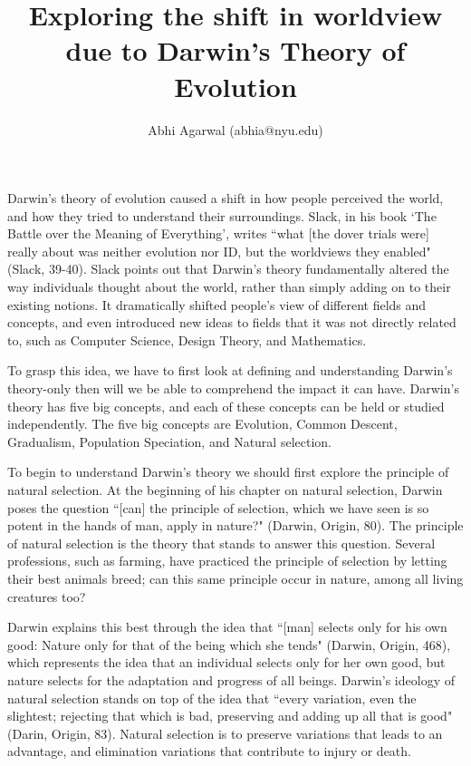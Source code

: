 \documentclass[11pt, oneside]{article}
\title{Exploring the shift in worldview due to Darwin's Theory of Evolution}
\author{Abhi Agarwal (abhia@nyu.edu)}
\date{}
\begin{document}
\maketitle

\par Darwin's theory of evolution caused a shift in how people perceived the world, and how they tried to understand their surroundings. Slack, in his book `The Battle over the Meaning of Everything', writes ``what [the dover trials were] really about was neither evolution nor ID, but the worldviews they enabled" (Slack, 39-40). Slack points out that Darwin's theory fundamentally altered the way individuals thought about the world, rather than simply adding on to their existing notions. It dramatically shifted people's view of different fields and concepts, and even introduced new ideas to fields that it was not directly related to, such as Computer Science, Design Theory, and Mathematics. 

\par To grasp this idea, we have to first look at defining and understanding Darwin's theory-only then will we be able to comprehend the impact it can have. Darwin's theory has five big concepts, and each of these concepts can be held or studied independently. The five big concepts are Evolution, Common Descent, Gradualism, Population Speciation, and Natural selection. 

\par To begin to understand Darwin's theory we should first explore the principle of natural selection. At the beginning of his chapter on natural selection, Darwin poses the question ``[can] the principle of selection, which we have seen is so potent in the hands of man, apply in nature?" (Darwin, Origin, 80). The principle of natural selection is the theory that stands to answer this question. Several professions, such as farming, have practiced the principle of selection by letting their best animals breed; can this same principle occur in nature, among all living creatures too? 

\par Darwin explains this best through the idea that ``[man] selects only for his own good: Nature only for that of the being which she tends" (Darwin, Origin, 468), which represents the idea that an individual selects only for her own good, but nature selects for the adaptation and progress of all beings. Darwin's ideology of natural selection stands on top of the idea that ``every variation, even the slightest; rejecting that which is bad, preserving and adding up all that is good" (Darin, Origin, 83). Natural selection is to preserve variations that leads to an advantage, and elimination variations that contribute to injury or death. 
\end{document}
